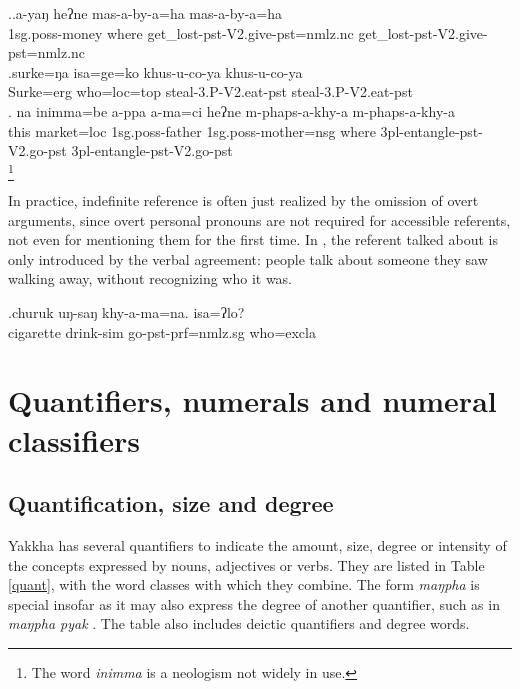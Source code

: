 \ex.\ag.a-yaŋ heʔne mas-a-by-a=ha mas-a-by-a=ha\\
{\sc 1sg.poss-}money where get\_lost{\sc [3sg]-pst-V2.give-pst=nmlz.nc} get\_lost{\sc [3sg]-pst-V2.give-pst=nmlz.nc}\\
\bg.surke=ŋa isa=ge=ko khus-u-co-ya khus-u-co-ya\\
Surke{\sc =erg} who{\sc =loc=top} steal{\sc -3.P-V2.eat-pst} steal{\sc -3.P-V2.eat-pst}\\
\bg. na inimma=be a-ppa  a-ma=ci                 heʔne m-phaps-a-khy-a                      m-phaps-a-khy-a\\
this market{\sc =loc} {\sc 1sg.poss-}father  {\sc 1sg.poss-}mother{\sc =nsg} where {\sc 3pl-}entangle{\sc -pst-V2.go-pst} {\sc 3pl-}entangle{\sc -pst-V2.go-pst}\\
\footnote{The word \emph{inimma} is a neologism not widely in use.} 

In practice, indefinite reference is often just realized by the omission of overt arguments, since overt personal pronouns are not required for accessible referents, not even for mentioning them for the first time. In \Next, the referent talked about is only introduced by the verbal agreement: people talk about someone they saw walking away, without recognizing who it was.

\exg.churuk uŋ-saŋ khy-a-ma=na. isa=ʔlo?\\
cigarette drink{\sc -sim} go{\sc [3sg]-pst-prf=nmlz.sg} who{\sc =excla}\\


\section{Quantifiers, numerals and numeral classifiers}\label{sec-quant}

\subsection{Quantification, size and degree}

Yakkha has several quantifiers to indicate the amount, size,  degree or intensity of the concepts expressed by nouns, adjectives or verbs. They are listed in Table \ref{quant}, with the  word classes with which they combine. The form  \emph{maŋpha}  is special insofar as it may also express  the degree of another quantifier, such as in \emph{maŋpha pyak} . The table also includes deictic quantifiers and degree words.

